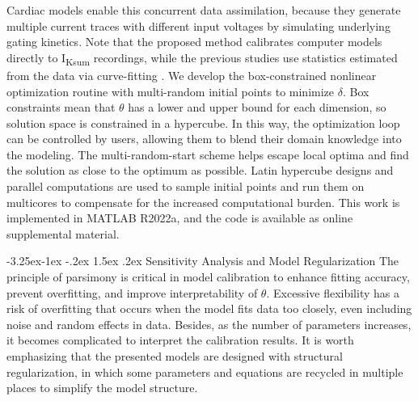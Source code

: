 \documentclass[11pt]{article}
\makeatletter
\renewcommand\subsection{\@startsection{subsection}{2}{\z@}%
                                     {-3.25ex\@plus -1ex \@minus -.2ex}%
                                     {1.5ex \@plus .2ex}%
                                     {\normalfont\fontfamily{phv}\fontsize{14}{17}\bfseries}}
\makeatother
\begin{document}
Cardiac models enable this concurrent data assimilation, because they generate multiple current traces with different input voltages by simulating underlying gating kinetics. Note that the proposed method calibrates computer models directly to I\textsubscript{Ksum} recordings, while the previous studies use statistics estimated from the data via curve-fitting \citep{du2013silico,du2015statistical, du2017silico, kim2022simulation}. We develop the box-constrained nonlinear optimization routine with multi-random initial points to minimize $\delta$. Box constraints mean that $\theta$ has a lower and upper bound for each dimension, so solution space is constrained in a hypercube. In this way, the optimization loop can be controlled by users, allowing them to blend their domain knowledge into the modeling. The multi-random-start scheme helps escape local optima and find the solution as close to the optimum as possible. Latin hypercube designs and parallel computations are used to sample initial points and run them on multicores to compensate for the increased computational burden. This work is implemented in MATLAB R2022a, and the code is available as online supplemental material.

\subsection{Sensitivity Analysis and Model Regularization}
The principle of parsimony is critical in model calibration to enhance fitting accuracy, prevent overfitting, and improve interpretability of $\theta$. Excessive flexibility has a risk of overfitting that occurs when the model fits data too closely, even including noise and random effects in data. Besides, as the number of parameters increases, it becomes complicated to interpret the calibration results. It is worth emphasizing that the presented models are designed with structural regularization, in which some parameters and equations are recycled in multiple places to simplify the model structure.
\end{document}
